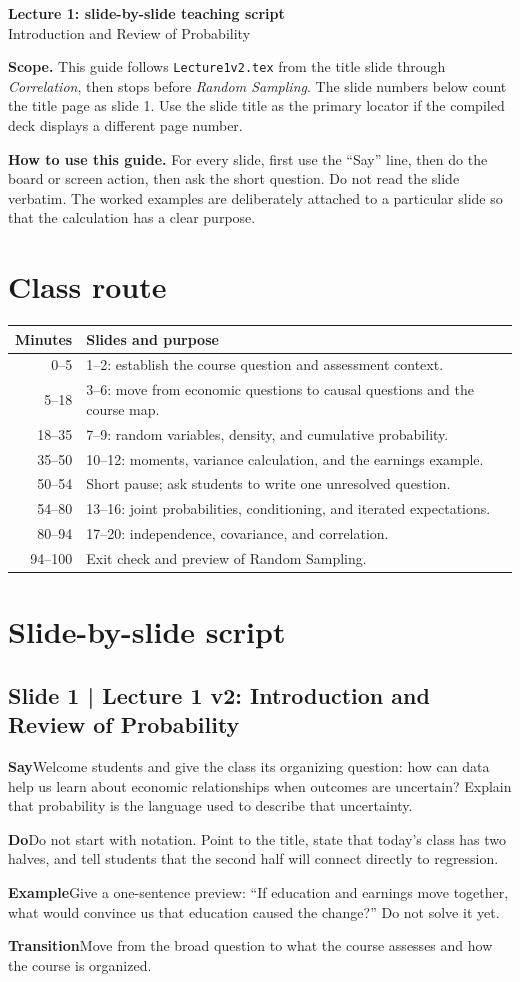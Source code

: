 \documentclass[11pt,a4paper]{article}
\newcommand{\heading}[1]{\section*{\color{accent}#1}}
\newcommand{\slideheading}[1]{\subsection*{\color{accent}#1}}
\newcommand{\cue}[2]{\par\noindent\textbf{#1}\quad #2\par}
\begin{document}
\begin{center}
{\Large\bfseries Lecture 1: slide-by-slide teaching script}\\[3pt]
{\normalsize Introduction and Review of Probability}
\end{center}

\textbf{Scope.} This guide follows \texttt{Lecture1v2.tex} from the title slide through \textit{Correlation}, then stops before \textit{Random Sampling}. The slide numbers below count the title page as slide 1. Use the slide title as the primary locator if the compiled deck displays a different page number.

\textbf{How to use this guide.} For every slide, first use the ``Say'' line, then do the board or screen action, then ask the short question. Do not read the slide verbatim. The worked examples are deliberately attached to a particular slide so that the calculation has a clear purpose.

\heading{Class route}
\begin{tabularx}{\textwidth}{@{}rX@{}}
\toprule
Minutes & Slides and purpose\\\midrule
0--5 & 1--2: establish the course question and assessment context.\\
5--18 & 3--6: move from economic questions to causal questions and the course map.\\
18--35 & 7--9: random variables, density, and cumulative probability.\\
35--50 & 10--12: moments, variance calculation, and the earnings example.\\
50--54 & Short pause; ask students to write one unresolved question.\\
54--80 & 13--16: joint probabilities, conditioning, and iterated expectations.\\
80--94 & 17--20: independence, covariance, and correlation.\\
94--100 & Exit check and preview of Random Sampling.\\
\bottomrule
\end{tabularx}

\heading{Slide-by-slide script}

\slideheading{Slide 1 | Lecture 1 v2: Introduction and Review of Probability}
\cue{Say}{Welcome students and give the class its organizing question: how can data help us learn about economic relationships when outcomes are uncertain? Explain that probability is the language used to describe that uncertainty.}
\cue{Do}{Do not start with notation. Point to the title, state that today's class has two halves, and tell students that the second half will connect directly to regression.}
\cue{Example}{Give a one-sentence preview: ``If education and earnings move together, what would convince us that education caused the change?'' Do not solve it yet.}
\cue{Transition}{Move from the broad question to what the course assesses and how the course is organized.}
\end{document}
